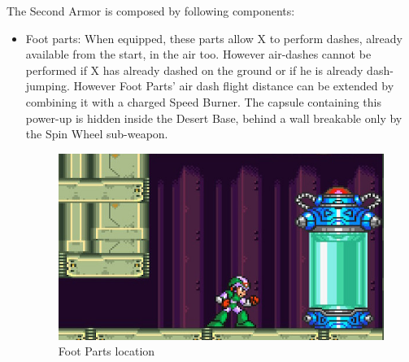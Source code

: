 The Second Armor is composed by following components:
\begin{itemize}
	\item Foot parts: When equipped, these parts allow X to perform dashes, already available from the start, in the air too. However air-dashes cannot be performed if X has already dashed on the ground or if he is already dash-jumping. However Foot Parts' air dash flight distance can be extended by combining it with a charged Speed Burner. The capsule containing this power-up is hidden inside the Desert Base, behind a wall breakable only by the Spin Wheel sub-weapon.
	\begin{figure}[htp]
		
		\centering
		\includegraphics[width=0.4\linewidth]{figures/X2/Overdrive_ostrich/Ostrich_capsule.jpg}	
		\caption{Foot Parts location}
	\end{figure}	
	

\end{itemize}
